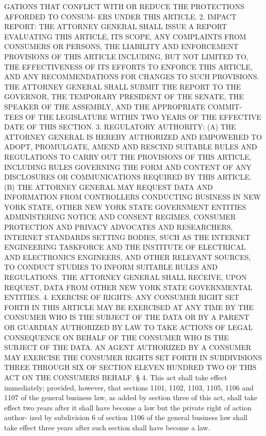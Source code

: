  GATIONS THAT CONFLICT WITH OR REDUCE THE PROTECTIONS AFFORDED TO CONSUM-
 ERS UNDER THIS ARTICLE.
   2. IMPACT REPORT: THE ATTORNEY GENERAL SHALL ISSUE A REPORT EVALUATING
 THIS  ARTICLE,  ITS SCOPE, ANY COMPLAINTS FROM CONSUMERS OR PERSONS, THE
 LIABILITY AND ENFORCEMENT PROVISIONS OF THIS ARTICLE INCLUDING, BUT  NOT
 LIMITED  TO,  THE  EFFECTIVENESS OF ITS EFFORTS TO ENFORCE THIS ARTICLE,
 AND ANY RECOMMENDATIONS FOR CHANGES TO  SUCH  PROVISIONS.  THE  ATTORNEY
 GENERAL SHALL SUBMIT THE REPORT TO THE GOVERNOR, THE TEMPORARY PRESIDENT
 OF  THE SENATE, THE SPEAKER OF THE ASSEMBLY, AND THE APPROPRIATE COMMIT-
 TEES OF THE LEGISLATURE WITHIN TWO YEARS OF THE EFFECTIVE DATE  OF  THIS
 SECTION.
   3. REGULATORY AUTHORITY: (A) THE ATTORNEY GENERAL IS HEREBY AUTHORIZED
 AND EMPOWERED TO ADOPT, PROMULGATE, AMEND AND RESCIND SUITABLE RULES AND
 REGULATIONS TO CARRY OUT THE PROVISIONS OF THIS ARTICLE, INCLUDING RULES
 GOVERNING  THE  FORM  AND  CONTENT  OF ANY DISCLOSURES OR COMMUNICATIONS
 REQUIRED BY THIS ARTICLE.
   (B) THE  ATTORNEY  GENERAL  MAY  REQUEST  DATA  AND  INFORMATION  FROM
 CONTROLLERS  CONDUCTING BUSINESS IN NEW YORK STATE, OTHER NEW YORK STATE
 GOVERNMENT ENTITIES ADMINISTERING NOTICE AND CONSENT  REGIMES,  CONSUMER
 PROTECTION  AND  PRIVACY  ADVOCATES  AND RESEARCHERS, INTERNET STANDARDS
 SETTING BODIES, SUCH AS  THE  INTERNET  ENGINEERING  TASKFORCE  AND  THE
 INSTITUTE  OF  ELECTRICAL  AND ELECTRONICS ENGINEERS, AND OTHER RELEVANT
 SOURCES, TO CONDUCT STUDIES TO INFORM SUITABLE  RULES  AND  REGULATIONS.
 THE  ATTORNEY  GENERAL  SHALL RECEIVE, UPON REQUEST, DATA FROM OTHER NEW
 YORK STATE GOVERNMENTAL ENTITIES.
   4. EXERCISE OF RIGHTS: ANY CONSUMER RIGHT SET FORTH  IN  THIS  ARTICLE
 MAY  BE  EXERCISED AT ANY TIME BY THE CONSUMER WHO IS THE SUBJECT OF THE
 DATA OR BY A PARENT OR GUARDIAN AUTHORIZED BY LAW  TO  TAKE  ACTIONS  OF
 LEGAL  CONSEQUENCE  ON  BEHALF OF THE CONSUMER WHO IS THE SUBJECT OF THE
 DATA. AN AGENT AUTHORIZED BY A CONSUMER MAY EXERCISE THE CONSUMER RIGHTS
 SET FORTH IN SUBDIVISIONS THREE THROUGH SIX OF  SECTION  ELEVEN  HUNDRED
 TWO OF THIS ACT ON THE CONSUMERS BEHALF.
   §  4.  This act shall take effect immediately; provided, however, that
 sections 1101, 1102, 1103, 1105, 1106 and 1107 of the  general  business
 law,  as added by section three of this act, shall take effect two years
 after it shall have become a law but the private right of action author-
 ized by subdivision 6 of section 1106 of the general business law  shall
 take effect three years after such section shall have become a law.